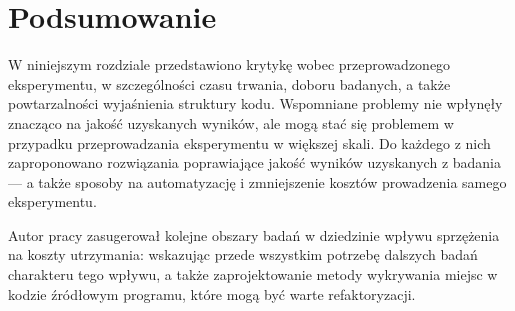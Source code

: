 \section{Podsumowanie}

W niniejszym rozdziale przedstawiono krytykę wobec przeprowadzonego eksperymentu,
w szczególności czasu trwania, doboru badanych, a także powtarzalności wyjaśnienia
struktury kodu.
Wspomniane problemy nie wpłynęły znacząco na jakość uzyskanych wyników, ale
mogą stać się problemem w przypadku przeprowadzania eksperymentu w większej skali.
Do każdego z nich zaproponowano rozwiązania poprawiające jakość wyników uzyskanych
z badania --- a także sposoby na automatyzację i zmniejszenie kosztów prowadzenia
samego eksperymentu.

Autor pracy zasugerował kolejne obszary badań w dziedzinie wpływu sprzężenia
na koszty utrzymania: wskazując przede wszystkim potrzebę dalszych badań
charakteru tego wpływu, a także zaprojektowanie metody wykrywania miejsc w
kodzie źródłowym programu, które mogą być warte refaktoryzacji.